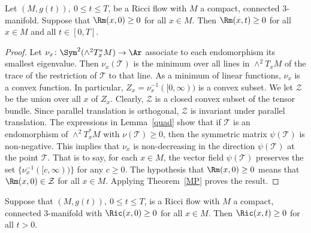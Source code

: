 \begin{corollary}
\label{cor:nonnegative-curvature-operator-preserved}
\label{rm>0}
Let $(M,g(t)),\ 0\le t\le T$, be a Ricci flow with $M$ a compact,
connected $3$-manifold. Suppose that  $\Rm(x,0)\ge 0$ for all
$x\in M$. Then $\Rm(x,t)\ge 0$ for all $x\in M$ and all $t\in
[0,T]$.
\end{corollary}

\begin{proof}
Let $\nu_x\colon \Sym^2(\wedge^2T^*_xM)\to \Ar$ associate to
each endomorphism its smallest eigenvalue. Then $\nu_x({\mathcal
T})$ is the minimum over all lines in $\wedge^2T_xM$ of the trace of
the restriction of ${\mathcal T}$ to that line. As a minimum of
linear functions, $\nu_x$ is a convex function. In particular,
$Z_x=\nu_x^{-1}([0,\infty))$ is a convex subset. We let ${\mathcal
Z}$ be the union over all $x$ of $Z_x$. Clearly, ${\mathcal Z}$ is a
closed convex subset of the tensor bundle. Since parallel
translation is orthogonal, ${\mathcal Z}$ is invariant under
parallel translation. The expressions in Lemma~\ref{quad} show that
if ${\mathcal T}$ is an endomorphism of $\wedge^2T^*_xM$ with
$\nu({\mathcal T})\ge 0$, then the symmetric matrix $\psi({\mathcal
T})$ is non-negative. This implies that $\nu_x$ is non-decreasing in
the direction $\psi({\mathcal T})$ at the point ${\mathcal T}$. That
is to say, for each $x\in M$, the vector field $\psi({\mathcal T})$
preserves the set $\{\nu_x^{-1}([c,\infty))\}$ for any $c\ge 0$. The
hypothesis that $\Rm(x,0)\ge 0$ means that $\Rm(x,0)\in
{\mathcal Z}$ for all $x\in M$. Applying Theorem~\ref{MP} proves the
result.
\end{proof}


\begin{corollary}
\label{cor:nonnegative-ricci-preserved}
\label{Ric>0}
Suppose that $(M,g(t)),\ 0\le t\le T$, is a Ricci flow with $M$ a
compact, connected $3$-manifold with $\Ric(x,0)\ge 0$ for all
$x\in M$. Then $\Ric(x,t)\ge 0$ for all $t>0$.
\end{corollary}


